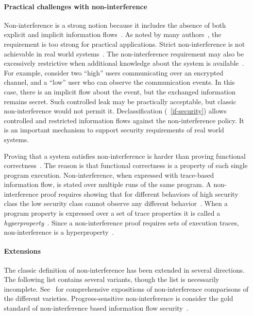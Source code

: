 \paragraph*{Practical challenges with non-interference}
Non-interference is a strong notion because it includes the absence of both 
explicit and implicit information flows~\cite{bossi2005}.
As noted by many authors~\cite{cecchetti2017,bossi2005}, the requirement is too strong for practical applications.
Strict non-interference is not achievable in real world systems~\cite{bossi2005}.
The non-interference requirement may also be excessively restrictive when additional knowledge about the system is available~\cite{bossi2005}.
For example, consider two \enquote{high} users communicating over an encrypted channel,
 and a \enquote{low} user who can observe the communication events.
In this case, there is an implicit flow about the event, but the exchanged information remains secret.
Such controlled leak may be practically acceptable, but classic non-interference would not permit it.
Declassification (\cf~\autoref{if-security}) allows controlled and restricted 
information flows against the non-interference policy.
It is an important mechanism to support security requirements of real world systems.

Proving that a system satisfies non-interference is harder than proving functional correctness~\cite{frumin2021}.
The reason is that functional correctness is a property of each single program execution.
Non-interference, when expressed with trace-based information flow, is stated over multiple runs of the same program.
A non-interference proof requires showing that for different behaviors of high security class the low security class cannot observe any different behavior~\cite{frumin2021}.
When a program property is expressed over a set of trace properties it is called a {\emph{hyperproperty}}~\cite{clarkson2010}.
Since a non-interference proof requires sets of execution traces, 
{non-interference} is a {hyperproperty}~\cite{mastroeni2019}.

\paragraph*{Extensions}
The classic definition of {non-interference} has been extended in several directions.
The following list contains several variants, though the list is necessarily incomplete.
See~\cite{vandermeyden2010,nelson2020,eggert2014} for comprehensive expositions of {non-interference} comparisons of the different varieties.
{Progress-sensitive non-interference} is consider the gold standard of non-interference based information flow security~\cite{derakhshan2024}.

